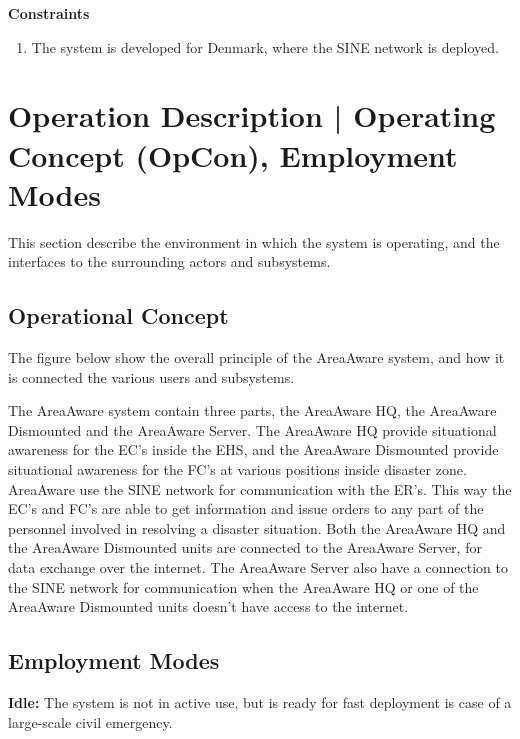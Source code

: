 \noindent \textbf{Constraints}
\begin{enumerate}
	\item The system is developed for Denmark, where the SINE network is deployed.
\end{enumerate}

\section{Operation Description | Operating Concept (OpCon), Employment Modes}

This section describe the environment in which the system is operating, and the interfaces to the surrounding actors and subsystems.

\subsection{Operational Concept}
The figure below show the overall principle of the AreaAware system, and how it is connected the various users and subsystems.


\FloatBarrier

\noindent The AreaAware system contain three parts, the AreaAware HQ, the AreaAware Dismounted and the AreaAware Server. The AreaAware HQ provide situational awareness for the EC's inside the EHS, and the AreaAware Dismounted provide situational awareness for the FC's at various positions inside disaster zone. AreaAware use the SINE network for communication with the ER's. This way the EC's and FC's are able to get information and issue orders to any part of the personnel involved in resolving a disaster situation. Both the AreaAware HQ and the AreaAware Dismounted units are connected to the AreaAware Server, for data exchange over the internet. The AreaAware Server also have a connection to the SINE network for communication when the AreaAware HQ or one of the AreaAware Dismounted units doesn't have access to the internet.

\subsection{Employment Modes}
\textbf{Idle:} The system is not in active use, but is ready for fast deployment is case of a large-scale civil emergency.\\

